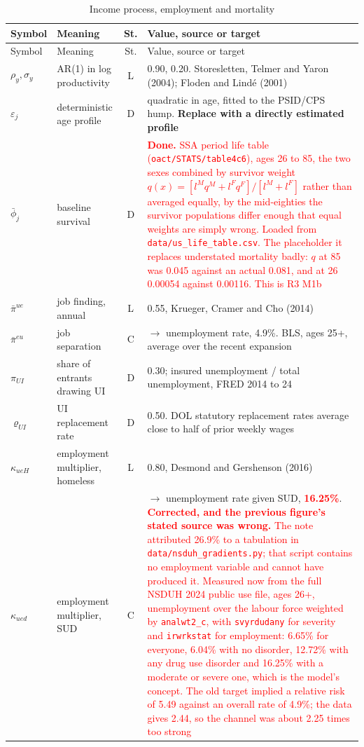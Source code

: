 \documentclass[11pt]{article}
\newcommand{\nw}[1]{\textcolor{red}{#1}}
\begin{document}
\begin{longtable}{lL{3.8cm}cL{5.8cm}}
\caption{Income process, employment and mortality}\\
\toprule
Symbol & Meaning & St. & Value, source or target\\
\midrule
\endfirsthead
\toprule
Symbol & Meaning & St. & Value, source or target\\
\midrule
\endhead
$\rho_y,\sigma_y$ & AR(1) in log productivity & L & 0.90, 0.20. Storesletten, Telmer and Yaron (2004); Floden and Lind\'e (2001)\\
$\varepsilon_j$ & deterministic age profile & D & quadratic in age, fitted to the PSID/CPS hump. \textbf{Replace with a directly estimated profile}\\
$\bar\phi_j$ & baseline survival & D & \nw{\textbf{Done.} SSA period life table (\texttt{oact/STATS/table4c6}), ages 26 to 85, the two sexes combined by survivor weight $q(x)=[l^M q^M+l^F q^F]/[l^M+l^F]$ rather than averaged equally, by the mid-eighties the survivor populations differ enough that equal weights are simply wrong. Loaded from \texttt{data/us\_life\_table.csv}. The placeholder it replaces understated mortality badly: $q$ at 85 was 0.045 against an actual 0.081, and at 26 0.00054 against 0.00116. This is R3 M1b}\\
$\bar\pi^{ue}$ & job finding, annual & L & 0.55, Krueger, Cramer and Cho (2014)\\
$\bar\pi^{eu}$ & job separation & C & $\rightarrow$ unemployment rate, 4.9\%. BLS, ages 25+, average over the recent expansion\\
$\pi_{UI}$ & share of entrants drawing UI & D & 0.30; insured unemployment / total unemployment, FRED 2014 to 24\\
$\varrho_{UI}$ & UI replacement rate & D & 0.50. DOL statutory replacement rates average close to half of prior weekly wages\\
$\kappa_{ueH}$ & employment multiplier, homeless & L & 0.80, Desmond and Gershenson (2016)\\
$\kappa_{ued}$ & employment multiplier, SUD & C & $\rightarrow$ unemployment rate given SUD, \nw{\textbf{16.25\%}}. \nw{\textbf{Corrected, and the previous figure's stated source was wrong.} The note attributed 26.9\% to a tabulation in \texttt{data/nsduh\_gradients.py}; that script contains no employment variable and cannot have produced it. Measured now from the full NSDUH 2024 public use file, ages 26+, unemployment over the labour force weighted by \texttt{analwt2\_c}, with \texttt{svyrdudany} for severity and \texttt{irwrkstat} for employment: 6.65\% for everyone, 6.04\% with no disorder, 12.72\% with any drug use disorder and 16.25\% with a moderate or severe one, which is the model's concept. The old target implied a relative risk of 5.49 against an overall rate of 4.9\%; the data gives 2.44, so the channel was about 2.25 times too strong}\\

\end{longtable}
\end{document}
